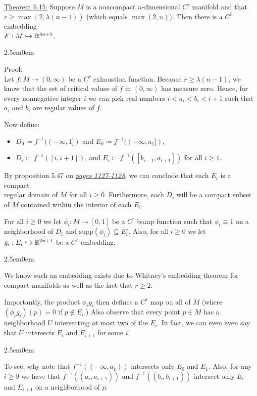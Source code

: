 \documentclass{book}
\newcommand{\inLinkRap}[2]{{\color{blue}\hyperlink{#1}{\textit{#2}}}}
\renewcommand{\hookrightarrow}{\lhook\joinrel\rightarrow}
\newcommand{\exTwo}{%
   \color{Purple}%
   \fontsize{13}{15}\selectfont%
}
\newcommand{\exThreeP}{%
   \color{RedViolet}%
   \fontsize{12}{14}\selectfont%
}
\newcommand{\exPPP}{%
   \color{VioletRed}%
   \fontsize{12}{14}\selectfont%
}
\newenvironment{myIndent}{%
   \begin{adjustwidth}{2.5em}{0em}%
}{%
   \end{adjustwidth}%
}
\newcommand{\supp}{\mathrm{supp}}
\newcommand{\retTwo}{\hfill\bigbreak}
\begin{document}
\exTwo\ul{Theorem 6.15:} Suppose $M$ is a noncompact $n$-dimensional $C^r$ manifold and that\\ $r \geq \max(2, \lambda(n - 1))$ {\color{red}(which equals $\max(2, n)$)}. Then there is a $C^r$ embedding\\ $F: M \hookrightarrow \mathbb{R}^{4n + 3}$.
\begin{myIndent}\exThreeP
	Proof:\\
	Let $f: M \to (0, \infty)$ be a $C^r$ exhaustion function. Because $r \geq \lambda(n - 1)$, we know that the set of critical values of $f$ in $(0, \infty)$ has measure zero. Hence, for every nonnegative integer $i$ we can pick real numbers $i < a_i < b_i < i + 1$ such that $a_i$ and $b_i$ are regular values of $f$.\retTwo
	
	Now define:
	\begin{itemize}
		\item $D_0 \coloneqq f^{-1}((-\infty, 1])$ and $E_0 \coloneqq  f^{-1}((-\infty, a_1])$,
		\item $D_i \coloneqq f^{-1}([i, i+1])$, and $E_i \coloneqq f^{-1}([b_{i-1}, a_{i+1}])$ for all $i \geq 1$.
	\end{itemize}

	By proposition 5.47 on \inLinkRap{Proposition 5.47 page 1127}{pages 1127-1128}, we can conclude that each $E_i$ is a compact\\ regular domain of $M$ for all $i \geq 0$. Furthermore, each $D_i$ will be a compact subset\\ of $M$ contained within the interior of each $E_i$.\newpage

	For all $i \geq 0$ we let $\phi_i: M \to [0, 1]$ be a $C^r$ bump function such that $\phi_i \equiv 1$ on a neighborhood of $D_i$ and $\supp(\phi_i) \subseteq E_i^\circ$. Also, for all $i \geq 0$ we let $g_i: E_i \hookrightarrow \mathbb{R}^{2n + 1}$ be a $C^r$ embedding.
	\begin{myIndent}\exPPP
		We know such an embedding exists due to Whitney's embedding theorem for\\ compact manifolds as well as the fact that $r \geq 2$.\retTwo
	\end{myIndent}

	Importantly, the product $\phi_i g_i$ then defines a $C^r$ map on all of $M$ (where $(\phi_i g_i)(p) = 0$ if $p \notin E_i$.) Also observe that every point $p \in M$ has a neighborhood $U$ intersecting at most two of the $E_i$. In fact, we can even even say that $U$ intersects $E_i$ and $E_{i+1}$ for some $i$.
	\begin{myIndent}\exPPP
		To see, why note that $f^{-1}((-\infty, a_1))$ intersects only $E_0$ and $E_1$. Also, for any\\ $i \geq 0$ we have that $f^{-1}((a_i, a_{i+1}))$ and $f^{-1}((b_i, b_{i+1}))$ intersect only $E_i$ and $E_{i+1}$ on a neighborhood of $p$.\retTwo
	\end{myIndent}


\end{myIndent}
\end{document}
